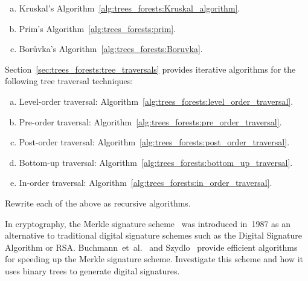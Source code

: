 \begin{problem}
\begin{enumerate}[(a)]
  \item Kruskal's
    Algorithm~\ref{alg:trees_forests:Kruskal_algorithm}.

  \item Prim's
    Algorithm~\ref{alg:trees_forests:prim}.

  \item Bor\r{u}vka's
    Algorithm~\ref{alg:trees_forests:Boruvka}.
  \end{enumerate}

\item Section~\ref{sec:trees_forests:tree_traversals} provides
  iterative algorithms for the following tree traversal techniques:
  \begin{enumerate}[(a)]
  \item Level-order traversal:
    Algorithm~\ref{alg:trees_forests:level_order_traversal}.

  \item Pre-order traversal:
    Algorithm~\ref{alg:trees_forests:pre_order_traversal}.

  \item Post-order traversal:
    Algorithm~\ref{alg:trees_forests:post_order_traversal}.

  \item Bottom-up traversal:
    Algorithm~\ref{alg:trees_forests:bottom_up_traversal}.

  \item In-order traversal:
    Algorithm~\ref{alg:trees_forests:in_order_traversal}.
  \end{enumerate}
  Rewrite each of the above as recursive
  algorithms.

\item In cryptography, the Merkle signature
  scheme~\cite{Merkle1987} was introduced in~1987 as an alternative to
  traditional digital signature schemes such as the Digital Signature
  Algorithm or RSA.
  Buchmann~et~al.~\cite{BuchmannEtAl2008} and Szydlo~\cite{Szydlo2004}
  provide efficient algorithms for speeding up the Merkle signature
  scheme. Investigate this scheme and how it uses binary trees to
  generate digital signatures.


\end{problem}
